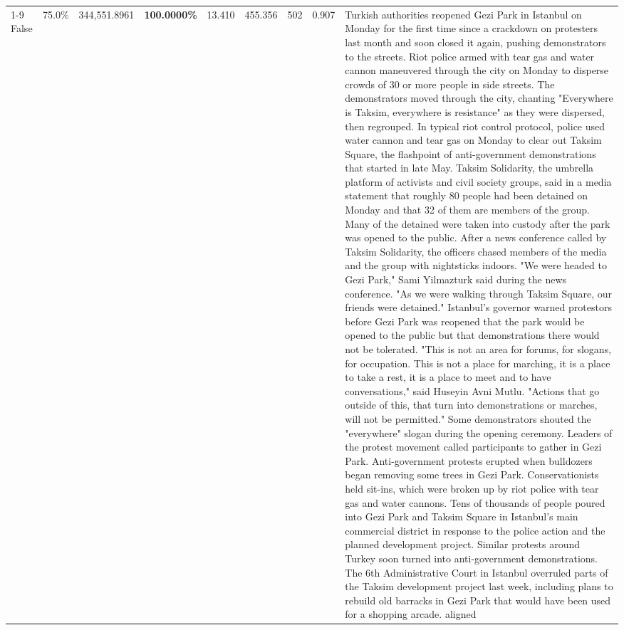 \begin{table}[H]
\begin{tabular}{lllrlllll}
\cline{1-9}
False & 75.0\% & 344,551.8961 & \bfseries \color{red} 100.0000\% & 13.410 & 455.356 & 502 & 0.907 & Turkish authorities reopened Gezi Park in Istanbul on Monday for the first time since a crackdown on protesters last month and soon closed it again, pushing demonstrators to the streets. Riot police armed with tear gas and water cannon maneuvered through the city on Monday to disperse crowds of 30 or more people in side streets. The demonstrators moved through the city, chanting "Everywhere is Taksim, everywhere is resistance" as they were dispersed, then regrouped. In typical riot control protocol, police used water cannon and tear gas on Monday to clear out Taksim Square, the flashpoint of anti-government demonstrations that started in late May. Taksim Solidarity, the umbrella platform of activists and civil society groups, said in a media statement that roughly 80 people had been detained on Monday and that 32 of them are members of the group. Many of the detained were taken into custody after the park was opened to the public. After a news conference called by Taksim Solidarity, the officers chased members of the media and the group with nightsticks indoors. "We were headed to Gezi Park," Sami Yilmazturk said during the news conference. "As we were walking through Taksim Square, our friends were detained." Istanbul's governor warned protestors before Gezi Park was reopened that the park would be opened to the public but that demonstrations there would not be tolerated. "This is not an area for forums, for slogans, for occupation. This is not a place for marching, it is a place to take a rest, it is a place to meet and to have conversations," said Huseyin Avni Mutlu. "Actions that go outside of this, that turn into demonstrations or marches, will not be permitted." Some demonstrators shouted the "everywhere" slogan during the opening ceremony. Leaders of the protest movement called participants to gather in Gezi Park. Anti-government protests erupted when bulldozers began removing some trees in Gezi Park. Conservationists held sit-ins, which were broken up by riot police with tear gas and water cannons. Tens of thousands of people poured into Gezi Park and Taksim Square in Istanbul's main commercial district in response to the police action and the planned development project. Similar protests around Turkey soon turned into anti-government demonstrations. The 6th Administrative Court in Istanbul overruled parts of the Taksim development project last week, including plans to rebuild old barracks in Gezi Park that would have been used for a shopping arcade. aligned \\

\end{tabular}
\end{table}
